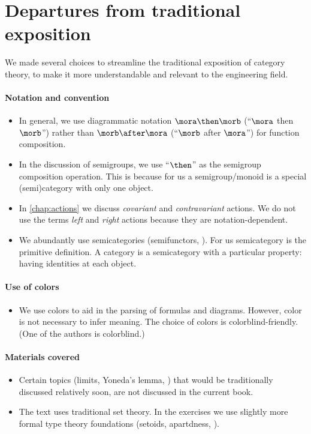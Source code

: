 
\section[Departures from tradition]{Departures from traditional exposition}

We made several choices to streamline the traditional exposition of category theory, to make it more understandable and relevant to the engineering field.

\paragraph{Notation and convention}
\begin{itemize}
    \item In general, we use diagrammatic notation $\mora \then \morb$ (``$\mora$ then $\morb$'') rather than $\morb \after \mora$ (``$\morb$ after $\mora$'') for function composition.
    \item In the discussion of semigroups, we use ``$\then$'' as the semigroup composition operation.
          This is because for us a semigroup/monoid is a special (semi)category with only one object.
    \item In \cref{chap:actions} we discuss \emph{covariant} and \emph{contravariant} actions.
          We do not use the terms \emph{left} and \emph{right} actions because they are notation-dependent.
    \item We abundantly use semicategories (semifunctors, \etc).
          For us semicategory is the primitive definition.
          A category is a semicategory with a particular property: having identities at each object.
\end{itemize}

\paragraph{Use of colors}
\begin{itemize}
    \item We use colors to aid in the parsing of formulas and diagrams.
          However, color is not necessary to infer meaning.
          The choice of colors is colorblind-friendly.
          (One of the authors is colorblind.)
\end{itemize}

\paragraph{Materials covered}
\begin{itemize}
    \item Certain topics (limits, Yoneda's lemma, \etc) that would be traditionally discussed relatively soon, are not discussed in the current book.
    \item The text uses traditional set theory.
          In the exercises we use slightly more formal type theory foundations (setoids, apartdness, \etc).

\end{itemize}

